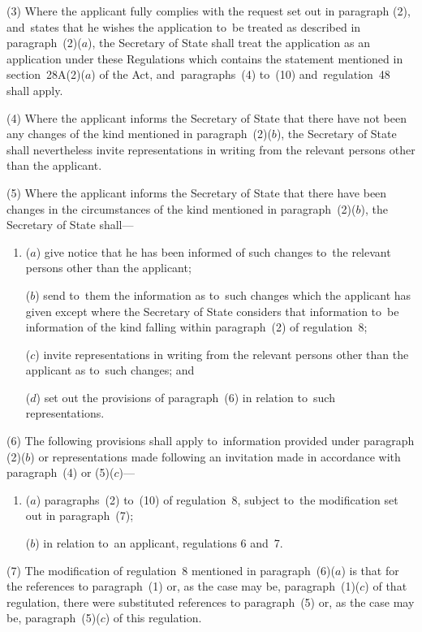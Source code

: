 \documentclass[12pt,a4paper]{article}
\begin{document}
(3) Where the applicant fully complies with the request set out in paragraph
(2), and~states that he wishes the application to~be treated as described in
paragraph~(2)($a$), the Secretary of State shall treat the application as an
application under these Regulations which contains the statement mentioned in
section~28A(2)($a$) of the Act, and~paragraphs~(4) to~(10) and~regulation~48 shall
apply.

(4) Where the applicant informs the Secretary of State that there have not been
any changes of the kind mentioned in paragraph~(2)($b$), the Secretary of State
shall nevertheless invite representations in writing from the relevant persons
other than the applicant.

(5) Where the applicant informs the Secretary of State that there have been
changes in the circumstances of the kind mentioned in paragraph~(2)($b$), the
Secretary of State shall—
\begin{enumerate}\item[]
($a$) give notice that he has been informed of such changes to~the relevant persons
other than the applicant;

($b$) send to~them the information as to~such changes which the applicant has given
except where the Secretary of State considers that information to~be information
of the kind falling within paragraph~(2) of regulation~8;

($c$) invite representations in writing from the relevant persons other than the
applicant as to~such changes; and

($d$) set out the provisions of paragraph~(6) in relation to~such representations.
\end{enumerate}

(6) The following provisions shall apply to~information provided under paragraph
(2)($b$) or representations made following an invitation made in accordance with
paragraph~(4) or (5)($c$)—
\begin{enumerate}\item[]
($a$) paragraphs~(2) 
to~(10)  %
of regulation~8, subject to~the modification set out in paragraph~(7);

($b$) in relation to~an applicant, regulations 6 and~7.
\end{enumerate}

(7) The modification of regulation~8 mentioned in paragraph~(6)($a$) is that for
the references to paragraph~(1) or, as the case may be, paragraph~(1)($c$) of that
regulation, there were substituted references to paragraph~(5) or, as the case
may be, paragraph~(5)($c$) of this regulation.
\end{document}
